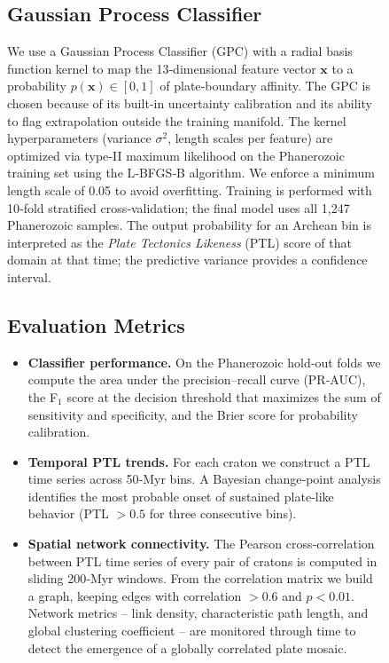 \documentclass{article}
\begin{document}
\begin{figure}[t]
{\subsection{Gaussian Process Classifier}
We use a Gaussian Process Classifier (GPC) with a radial basis function kernel to map the 13‑dimensional feature vector \(\mathbf{x}\) to a probability \(p(\mathbf{x}) \in [0,1]\) of plate‑boundary affinity.
The GPC is chosen because of its built‑in uncertainty calibration and its ability to flag extrapolation outside the training manifold.
The kernel hyperparameters (variance \(\sigma^2\), length scales per feature) are optimized via type‑II maximum likelihood on the Phanerozoic training set using the L‑BFGS‑B algorithm.
We enforce a minimum length scale of 0.05 to avoid overfitting.
Training is performed with 10‑fold stratified cross‑validation; the final model uses all 1,247 Phanerozoic samples.
The output probability for an Archean bin is interpreted as the \emph{Plate Tectonics Likeness} (PTL) score of that domain at that time; the predictive variance provides a confidence interval.

\subsection{Evaluation Metrics}
\begin{itemize}
    \item \textbf{Classifier performance.}  
    On the Phanerozoic hold‑out folds we compute the area under the precision–recall curve (PR‑AUC), the F$_1$ score at the decision threshold that maximizes the sum of sensitivity and specificity, and the Brier score for probability calibration.
    \item \textbf{Temporal PTL trends.}  
    For each craton we construct a PTL time series across 50‑Myr bins.  
    A Bayesian change‑point analysis identifies the most probable onset of sustained plate‑like behavior (PTL \(>0.5\) for three consecutive bins).
    \item \textbf{Spatial network connectivity.}  
    The Pearson cross‑correlation between PTL time series of every pair of cratons is computed in sliding 200‑Myr windows.  
    From the correlation matrix we build a graph, keeping edges with correlation \(>0.6\) and \(p<0.01\).  
    Network metrics – link density, characteristic path length, and global clustering coefficient – are monitored through time to detect the emergence of a globally correlated plate mosaic.
\end{itemize}

}
\end{figure}
\end{document}
